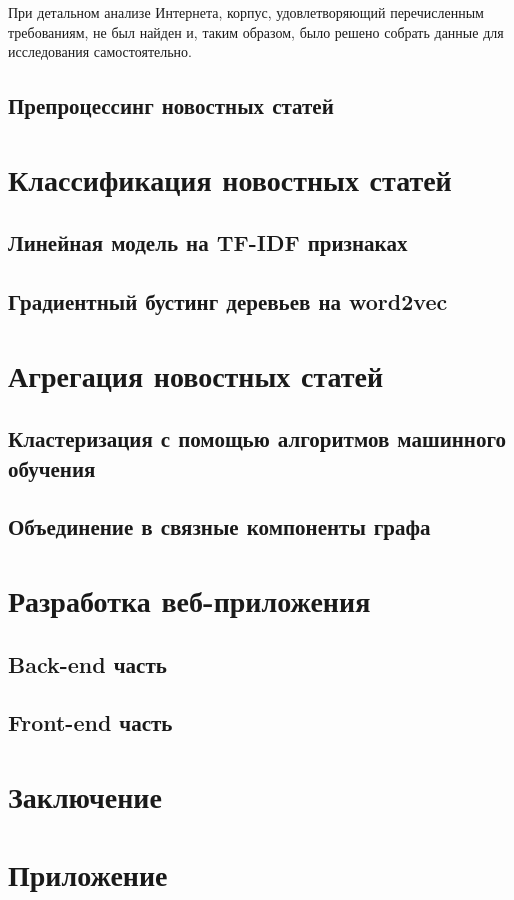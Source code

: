 \documentclass[a4paper, 14pt]{extarticle}
\begin{document}
При детальном анализе Интернета, корпус, удовлетворяющий перечисленным требованиям, не был найден и, таким образом,
было решено собрать данные для исследования самостоятельно.

\subsection{Препроцессинг новостных статей}
\section{Классификация новостных статей}
\subsection{Линейная модель на TF-IDF признаках}
\subsection{Градиентный бустинг деревьев на word2vec}
\section{Агрегация новостных статей}
\subsection{Кластеризация с помощью алгоритмов машинного обучения}
\subsection{Объединение в связные компоненты графа}
\section{Разработка веб-приложения}
\subsection{Back-end часть}
\subsection{Front-end часть}
\section{Заключение}


\setcounter{secnumdepth}{0}
\section{Приложение}
\end{document}
